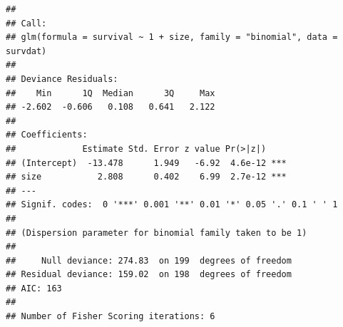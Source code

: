 \documentclass[12pt,a4paper]{scrartcl}\usepackage[]{graphicx}\usepackage[]{color}
\makeatletter
\newenvironment{kframe}{%
 \def\at@end@of@kframe{}%
 \ifinner\ifhmode%
  \def\at@end@of@kframe{\end{minipage}}%
  \begin{minipage}{\columnwidth}%
 \fi\fi%
 \def\FrameCommand##1{\hskip\@totalleftmargin \hskip-\fboxsep
 \colorbox{shadecolor}{##1}\hskip-\fboxsep
     \hskip-\linewidth \hskip-\@totalleftmargin \hskip\columnwidth}%
 \MakeFramed {\advance\hsize-\width
   \@totalleftmargin\z@ \linewidth\hsize
   \@setminipage}}%
 {\par\unskip\endMakeFramed%
 \at@end@of@kframe}
\newenvironment{knitrout}{}{} %
\makeatother
\begin{document}
\begin{Answer}
\begin{knitrout}
\begin{kframe}
\begin{alltt}
\end{alltt}
\begin{verbatim}
## 
## Call:
## glm(formula = survival ~ 1 + size, family = "binomial", data = survdat)
## 
## Deviance Residuals: 
##    Min      1Q  Median      3Q     Max  
## -2.602  -0.606   0.108   0.641   2.122  
## 
## Coefficients:
##             Estimate Std. Error z value Pr(>|z|)    
## (Intercept)  -13.478      1.949   -6.92  4.6e-12 ***
## size           2.808      0.402    6.99  2.7e-12 ***
## ---
## Signif. codes:  0 '***' 0.001 '**' 0.01 '*' 0.05 '.' 0.1 ' ' 1
## 
## (Dispersion parameter for binomial family taken to be 1)
## 
##     Null deviance: 274.83  on 199  degrees of freedom
## Residual deviance: 159.02  on 198  degrees of freedom
## AIC: 163
## 
## Number of Fisher Scoring iterations: 6
\end{verbatim}
\end{kframe}
\end{knitrout}
\end{Answer}
\end{document}
